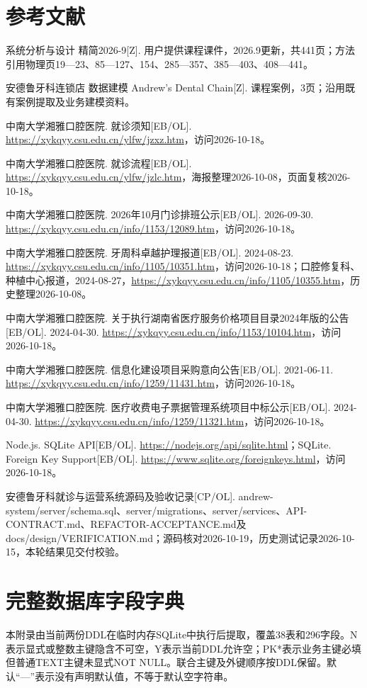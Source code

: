 \documentclass[UTF8,12pt,a4paper,fontset=none]{ctexart}
\begin{document}
\section*{参考文献}
\noindent [1] 系统分析与设计 精简2026-9[Z]. 用户提供课程课件，2026.9更新，共441页；方法引用物理页19—23、85—127、154、285—357、385—403、408—441。\par
\noindent [2] 安德鲁牙科连锁店 数据建模 Andrew’s Dental Chain[Z]. 课程案例，3页；沿用既有案例提取及业务建模资料。\par
\noindent [3] 中南大学湘雅口腔医院. 就诊须知[EB/OL]. \url{https://xykqyy.csu.edu.cn/ylfw/jzxz.htm}，访问2026-10-18。\par
\noindent [4] 中南大学湘雅口腔医院. 就诊流程[EB/OL]. \url{https://xykqyy.csu.edu.cn/ylfw/jzlc.htm}，海报整理2026-10-08，页面复核2026-10-18。\par
\noindent [5] 中南大学湘雅口腔医院. 2026年10月门诊排班公示[EB/OL]. 2026-09-30. \url{https://xykqyy.csu.edu.cn/info/1153/12089.htm}，访问2026-10-18。\par
\noindent [6] 中南大学湘雅口腔医院. 牙周科卓越护理报道[EB/OL]. 2024-08-23. \url{https://xykqyy.csu.edu.cn/info/1105/10351.htm}，访问2026-10-18；口腔修复科、种植中心报道，2024-08-27，\url{https://xykqyy.csu.edu.cn/info/1105/10355.htm}，历史整理2026-10-08。\par
\noindent [7] 中南大学湘雅口腔医院. 关于执行湖南省医疗服务价格项目目录2024年版的公告[EB/OL]. 2024-04-30. \url{https://xykqyy.csu.edu.cn/info/1153/10104.htm}，访问2026-10-18。\par
\noindent [8] 中南大学湘雅口腔医院. 信息化建设项目采购意向公告[EB/OL]. 2021-06-11. \url{https://xykqyy.csu.edu.cn/info/1259/11431.htm}，访问2026-10-18。\par
\noindent [9] 中南大学湘雅口腔医院. 医疗收费电子票据管理系统项目中标公示[EB/OL]. 2024-04-30. \url{https://xykqyy.csu.edu.cn/info/1259/11321.htm}，访问2026-10-18。\par
\noindent [10] Node.js. SQLite API[EB/OL]. \url{https://nodejs.org/api/sqlite.html}；SQLite. Foreign Key Support[EB/OL]. \url{https://www.sqlite.org/foreignkeys.html}，访问2026-10-18。\par
\noindent [11] 安德鲁牙科就诊与运营系统源码及验收记录[CP/OL]. andrew-system/server/schema.sql、server/migrations、server/services、API-CONTRACT.md、REFACTOR-ACCEPTANCE.md及docs/design/VERIFICATION.md；源码核对2026-10-19，历史测试记录2026-10-15，本轮结果见交付校验。\par
\appendix
\section{完整数据库字段字典}
本附录由当前两份DDL在临时内存SQLite中执行后提取，覆盖38表和296字段。N表示显式或整数主键隐含不可空，Y表示当前DDL允许空；PK*表示业务主键必填但普通TEXT主键未显式NOT NULL。联合主键及外键顺序按DDL保留。默认“—”表示没有声明默认值，不等于默认空字符串。\par
{}
\end{document}
